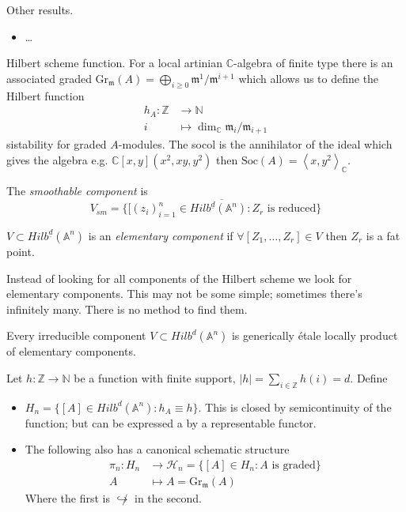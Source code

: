 Other results.
\begin{itemize}
\item …
\end{itemize}
Hilbert scheme function.
For a local artinian $\mathbb{C}$-algebra of
finite type there is an associated graded
$\text{Gr}_\mathfrak{m}(A)
=\bigoplus_{i \geq 0}\mathfrak{m}^1/\mathfrak{m}^{i+1}$ 
which allows us to define the Hilbert function
\begin{align*}
h_A: \mathbb{Z} &\longrightarrow \mathbb{N} \\
i &\longmapsto \dim_\mathbb{C} \mathfrak{m}_i/\mathfrak{m}_{i+1}
\end{align*}
sistability for graded $A$-modules.
The socol is the annihilator of
the ideal which gives the algebra
e.g. $\mathbb{C}[x,y](x^2,xy,y^2)$ then
$\text{Soc}(A)=\left<x,y^2\right>_\mathbb{C}$.

\medskip\noindent
\begin{definition}
\label{definition-smoothable-component}
The {\it smoothable component} is 
 $$
V_{sm}=\overline{\{[(z_i)_{i=1}^n \in Hilb^{\underline{d}}(\mathbb{A}^n):
Z_r\text{ is reduced}\}}
$$
\end{definition}

\begin{definition}
\label{definition-elementary-componenet}
$V \subset Hilb^{\underline{d}}(\mathbb{A}^n)$ is
an {\it elementary component} if
$\forall [Z_1,\ldots,Z_r] \in V$
then $Z_r$ is a fat point.
\end{definition}

Instead of looking for all components of the Hilbert scheme
we look for elementary components. This may not be some simple;
sometimes there's infinitely many. There
is no method to find them.

\begin{theorem}[Irrabaro]
\label{theorem-I}
Every irreducible component $V \subset Hilb^d(\mathbb{A}^n)$ 
is generically étale locally product of elementary components.
\end{theorem}

\begin{definition}
\label{definition-}
Let $h:\mathbb{Z} \to \mathbb{N}$ be a function
with finite support, $|h|=\sum_{ i \in \mathbb{Z}}h(i)=d$. Define
\begin{itemize}
\item $H_n=\{[A] \in Hilb^d(\mathbb{A}^n): h_A \equiv h\}$.
This is closed by semicontinuity of the function; but can be expressed
a by a representable functor.
\item The following also has a canonical schematic structure
\begin{align*}
\pi_n:H_n  &\longrightarrow \mathcal{H}_n=\{[A] \in H_n: A\text{ is graded}\} \\
A &\longmapsto A=\text{Gr}_{\mathfrak{m}}(A)
\end{align*}
Where the first is $\not\hookrightarrow $ in the second.
\end{itemize}
\end{definition}

